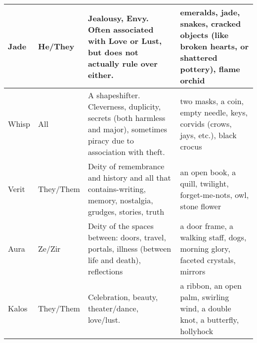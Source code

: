 \documentclass[blue]{GL2020}
\begin{document}
\begin{tabularx}{\textwidth}{|>{\centering\arraybackslash} m{1.8cm} |>{\centering\arraybackslash} m{1.5cm} | X |X |}
\hline	
	Jade & He/They & Jealousy, Envy. Often associated with Love or Lust, but does not actually rule over either. & emeralds, jade, snakes, cracked objects (like broken hearts, or shattered pottery), flame orchid \\
\hline	
	Whisp & All & A shapeshifter. Cleverness, duplicity, secrets (both harmless and major), sometimes piracy due to association with theft. & two masks, a coin, empty needle, keys, corvids (crows, jays, etc.), black crocus \\
\hline	
	Verit & They/Them & Deity of remembrance and history and all that contains-writing, memory, nostalgia, grudges, stories, truth & an open book, a quill, twilight, forget-me-nots, owl, stone flower \\
\hline	
	Aura & Ze/Zir & Deity of the spaces between: doors, travel, portals, illness (between life and death), reflections & a door frame, a walking staff, dogs, morning glory, faceted crystals, mirrors \\
\hline	
	Kalos & They/Them & Celebration, beauty, theater/dance, love/lust. & a ribbon, an open palm, swirling wind, a double knot, a butterfly, hollyhock \\
\hline	
\end{tabularx}
\end{document}
